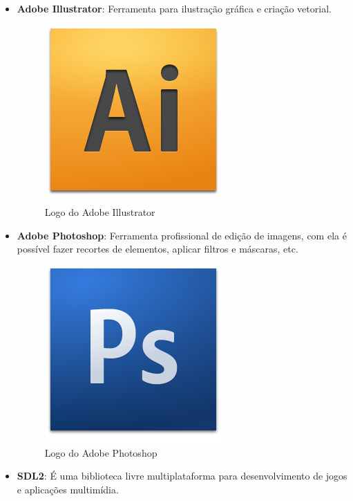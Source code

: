 \documentclass[11pt]{article} %
\begin{document}
\begin{itemize}
\item \textbf{Adobe Illustrator}: Ferramenta para ilustração gráfica e criação vetorial.

\begin{figure}[!htp]
\centering
\includegraphics[scale=0.3]{res/adobe_illustrator.png}
\caption{Logo do Adobe Illustrator}
\label{Adobe Illustrator}
\end{figure}

\item \textbf{Adobe Photoshop}: Ferramenta profissional de edição de imagens, com ela é possível fazer recortes de elementos, aplicar filtros e máscaras, etc.

\begin{figure}[!htp]
\centering
\includegraphics[scale=0.3]{res/Photoshop.png}
\caption{Logo do Adobe Photoshop}
\label{Adobe Photoshop}
\end{figure}

\item \textbf{SDL2}: É uma biblioteca livre multiplataforma para desenvolvimento de jogos e aplicações multimídia.


\end{itemize}
\end{document}
